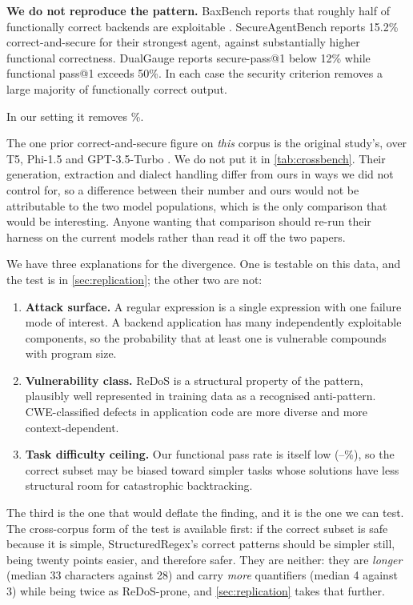 \documentclass[11pt]{article}
\begin{document}
\textbf{We do not reproduce the pattern.} BaxBench reports that roughly half
of functionally correct backends are exploitable \citep{vero2025baxbench}.
SecureAgentBench reports 15.2\%
correct-and-secure for their strongest agent, against substantially higher
functional correctness. DualGauge reports secure-pass@1 below
12\% while functional pass@1 exceeds 50\%. In each case the security criterion
removes a large
majority of functionally correct output.

In our setting it removes \vulngivencorrect{}\%.

The one prior correct-and-secure figure on \emph{this} corpus is
the original study's, over T5, Phi-1.5 and GPT-3.5-Turbo
\citep{siddiq2024regexeval}. We do not
put it in \cref{tab:crossbench}. Their generation, extraction and dialect
handling differ from ours in ways we did not control for, so a difference
between their number and ours would not be attributable to the two model
populations, which is the only comparison that would be interesting. Anyone
wanting that comparison should re-run their harness on the current models
rather than read it off the two papers.

We have three explanations for the divergence. One is testable on this data,
and the test is in \cref{sec:replication}; the other two are not:

\begin{enumerate}
\item \textbf{Attack surface.} A regular expression is a single expression
with one failure mode of interest. A backend application has many
independently exploitable components, so the probability that at least one is
vulnerable compounds with program size.
\item \textbf{Vulnerability class.} ReDoS is a structural property of the
pattern, plausibly well represented in training data as a recognised
anti-pattern. CWE-classified defects in application code are more diverse and
more context-dependent.
\item \textbf{Task difficulty ceiling.} Our functional pass rate is itself low
(\passlo{}--\passhi{}\%), so the correct subset may be biased toward simpler tasks whose
solutions have less structural room for catastrophic backtracking.
\end{enumerate}

The third is the one that would deflate the finding, and it is the one we can
test. The cross-corpus form of the test is available first: if the correct
subset is safe because it is simple, StructuredRegex's correct patterns should
be simpler still, being twenty points easier, and therefore safer. They are
neither: they are \emph{longer} (median 33 characters against 28) and carry
\emph{more} quantifiers (median 4 against 3) while being twice as ReDoS-prone,
and \cref{sec:replication} takes that further.
\end{document}
